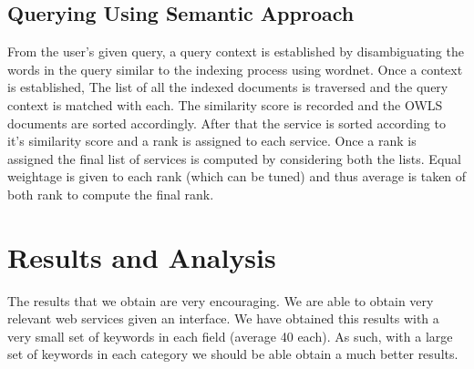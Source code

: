 \documentclass[12pt, oneside]{book}
\begin{document}
\subsection{Querying Using Semantic Approach}
From the user's given query, a query context is established by disambiguating the words in the query similar to the indexing process using wordnet. Once a context is established, The list of all the indexed documents is traversed and the query context is matched with each. The similarity score is recorded and the OWLS documents are sorted accordingly. After that the service is sorted according to it's similarity score and a rank is assigned to each service. Once a rank is assigned the final list of services is computed by considering both the lists. Equal weightage is given to each rank (which can be tuned) and thus average is taken of both rank to compute the final rank.

\section{Results and Analysis}
The results that we obtain are very encouraging. We are able to obtain very relevant web services given an interface. We have obtained this results with a very small set of keywords in each field (average 40 each). As such, with a large set of keywords in each category we should be able obtain a much better results.
\end{document}
